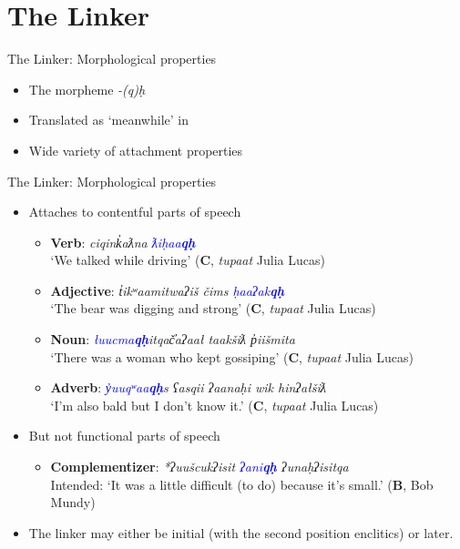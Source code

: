 \section{The Linker}

\begin{frame}{The Linker: Morphological properties}

\begin{itemize}
\item The morpheme \textit{-(q)ḥ}	
\item Translated as `meanwhile' in \cite{sapir1939}
\item Wide variety of attachment properties
\end{itemize}

\end{frame}

\begin{frame}{The Linker: Morphological properties}

\begin{itemize}
\item Attaches to contentful parts of speech
\begin{itemize}
\item \textbf{Verb}: \textit{ciqink̓aƛna \textcolor{blue}{ƛiḥaa\textbf{qḥ}}} \\ \hspace{5pt} `We talked while driving' (\textbf{C}, \textit{tupaat} Julia Lucas)
\item \textbf{Adjective}: \textit{t̓ikʷaamitwaʔiš čims \textcolor{blue}{ḥaaʔak\textbf{qḥ}}} \\ \hspace{5pt} `The bear was digging and strong'  (\textbf{C}, \textit{tupaat} Julia Lucas)
\item \textbf{Noun}: \textit{\textcolor{blue}{łuucma\textbf{qḥ}}itqač̓aʔaał taakšiƛ p̓iišmita} \\ \hspace{5pt} `There was a woman who kept gossiping' (\textbf{C}, \textit{tupaat} Julia Lucas)
\item \textbf{Adverb}: \textit{\textcolor{blue}{y̓uuqʷaa\textbf{qḥ}}s ʕasqii ʔaanaḥi wik hinʔałšiƛ} \\ \hspace{5pt} `I'm also bald but I don't know it.' (\textbf{C}, \textit{tupaat} Julia Lucas)
\end{itemize}
\item But not functional parts of speech
\begin{itemize}
\item \textbf{Complementizer}: \textit{*ʔuušcukʔisit \textcolor{blue}{ʔani\textbf{qḥ}} ʔunaḥʔisitqa} \\ \hspace{5pt} Intended: `It was a little difficult (to do) because it's small.' (\textbf{B}, Bob Mundy)
\end{itemize}
\item The linker may either be initial (with the second position enclitics) or later.
\end{itemize}

\end{frame}

